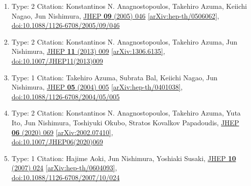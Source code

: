 \documentclass[a4paper,10pt]{article}
\begin{document}
\begin{enumerate}
\begin{enumerate}
  \item Type: 2 Citation: Konstantinos N. Anagnostopoulos, Takehiro Azuma, Keiichi Nagao, Jun Nishimura, \href{https://www.doi.org/10.1088/1126-6708/2005/09/046}{JHEP {\bf 09} (2005) 046}  \href{https://arxiv.org/abs/hep-th/0506062}{[arXiv:hep-th/0506062]},\\\href{https://www.doi.org/10.1088/1126-6708/2005/09/046}{doi:10.1088/1126-6708/2005/09/046}
  \item Type: 2 Citation: Konstantinos N. Anagnostopoulos, Takehiro Azuma, Jun Nishimura, \href{https://www.doi.org/10.1007/JHEP11(2013)009}{JHEP {\bf 11} (2013) 009}  \href{https://arxiv.org/abs/1306.6135}{[arXiv:1306.6135]},\\\href{https://www.doi.org/10.1007/JHEP11(2013)009}{doi:10.1007/JHEP11(2013)009}
  \item Type: 1 Citation: Takehiro Azuma, Subrata Bal, Keiichi Nagao, Jun Nishimura, \href{https://www.doi.org/10.1088/1126-6708/2004/05/005}{JHEP {\bf 05} (2004) 005}  \href{https://arxiv.org/abs/hep-th/0401038}{[arXiv:hep-th/0401038]},\\\href{https://www.doi.org/10.1088/1126-6708/2004/05/005}{doi:10.1088/1126-6708/2004/05/005}
  \item Type: 2 Citation: Konstantinos N. Anagnostopoulos, Takehiro Azuma, Yuta Ito, Jun Nishimura, Toshiyuki Okubo, Stratos Kovalkov Papadoudis, \href{https://www.doi.org/10.1007/JHEP06(2020)069}{JHEP {\bf 06} (2020) 069}  \href{https://arxiv.org/abs/2002.07410}{[arXiv:2002.07410]},\\\href{https://www.doi.org/10.1007/JHEP06(2020)069}{doi:10.1007/JHEP06(2020)069}
  \item Type: 1 Citation: Hajime Aoki, Jun Nishimura, Yoshiaki Susaki, \href{https://www.doi.org/10.1088/1126-6708/2007/10/024}{JHEP {\bf 10} (2007) 024}  \href{https://arxiv.org/abs/hep-th/0604093}{[arXiv:hep-th/0604093]},\\\href{https://www.doi.org/10.1088/1126-6708/2007/10/024}{doi:10.1088/1126-6708/2007/10/024}

\end{enumerate}
\end{enumerate}
\end{document}
